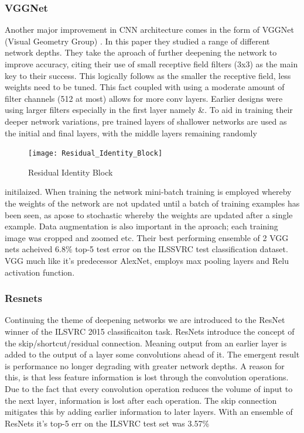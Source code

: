   \subsubsection{VGGNet}
    Another major improvement in CNN architecture comes in the form of VGGNet (Visual Geometry Group) \citep{Simonyan2015}. In this paper they studied a range of different network depths. They take the aproach of further deepening the network to improve accuracy, citing their use of small receptive field filters (3x3) as the main key to their success. This logically follows as the smaller the receptive field, less weights need to be tuned. This fact coupled with using a moderate amount of filter channels (512 at most) allows for more conv layers. Earlier designs were using larger filters especially in the first layer namely \citep{Krizhevsky}\&\citep{Sermanet2013}. To aid in training their deeper network variations, pre trained layers of shallower networks are used as the initial and final layers, with the middle layers remaining randomly
          \begin{figure}
            \centering
            \texttt{[image: Residual\_Identity\_Block]}
            \caption{\label{fig:resnet_id_block}Residual Identity Block}
          \end{figure}
     initilaized. When training the network mini-batch training is employed whereby the weights of the network are not updated until a batch of training examples has been seen, as apose to stochastic whereby the weights are updated after a single example. Data augmentation is also important in the aproach; each training image was cropped and zoomed etc. Their best performing ensemble of 2 VGG nets acheived 6.8\% top-5 test error on the ILSSVRC test classification dataset. VGG much like it's predecessor AlexNet, employs max pooling layers and Relu activation function.

  \subsubsection{Resnets}
    Continuing the theme of deepening networks we are introduced to the ResNet \citep{He} winner of the ILSVRC 2015 classificaiton task. ResNets introduce the concept of the skip/shortcut/residual connection. Meaning output from an earlier layer is added to the output of a layer some convolutions ahead of it. The emergent result is performance no longer degrading with greater network depths. A reason for this, is that less feature information is lost through the convolution operations. Due to the fact that every convolution operation reduces the volume of input to the next layer, information is lost after each operation. The skip connection mitigates this by adding earlier information to later layers. With an ensemble of ResNets it's top-5 err on the ILSVRC test set was 3.57\%
